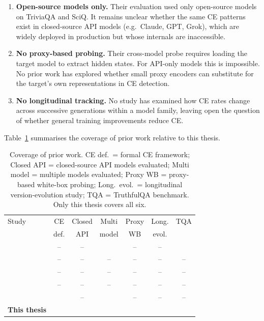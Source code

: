 \documentclass[12pt,twocolumn]{article}
\newcommand{\cmark}{\ding{51}}
\begin{document}
\begin{enumerate}[nosep]
\item \textbf{Open-source models only.} Their evaluation used only
  open-source models on TriviaQA and SciQ. It remains unclear
  whether the same CE patterns exist in closed-source API models
  (e.g.\ Claude, GPT, Grok), which are widely deployed in production
  but whose internals are inaccessible.
\item \textbf{No proxy-based probing.} Their cross-model probe
  requires loading the target model to extract hidden states. For
  API-only models this is impossible. No prior work has explored
  whether small proxy encoders can substitute for the target's own
  representations in CE detection.
\item \textbf{No longitudinal tracking.} No study has examined how
  CE rates change across successive generations within a model
  family, leaving open the question of whether general training
  improvements reduce CE.
\end{enumerate}

Table~\ref{tab:gap} summarises the coverage of prior work relative
to this thesis.

\begin{table}[H]
\centering
\tiny
\setlength{\tabcolsep}{3pt}
\begin{tabular}{@{}lcccccc@{}}
\toprule
Study & CE & Closed & Multi & Proxy & Long. & TQA \\
      & def. & API & model & WB   & evol. &     \\
\midrule
\citet{lin2022truthfulqa}       & -- & -- & \cmark & -- & -- & \cmark \\
\citet{azaria2023internal}      & -- & -- & --         & -- & -- & -- \\
\citet{manakul2023selfcheckgpt} & -- & -- & --         & -- & -- & -- \\
\citet{han2025factuality}       & -- & -- & --         & -- & -- & -- \\
\citet{tan2025consistent}       & \cmark & -- & \cmark & -- & -- & -- \\
\textbf{This thesis}            & \cmark & \cmark & \cmark & \cmark & \cmark & \cmark \\
\bottomrule
\end{tabular}
\caption{Coverage of prior work. CE def.\ = formal CE framework;
Closed API = closed-source API models evaluated;
Multi model = multiple models evaluated; Proxy WB = proxy-based
white-box probing; Long.\ evol.\ = longitudinal version-evolution
study; TQA = TruthfulQA benchmark. Only this thesis covers all six.}
\label{tab:gap}
\end{table}
\end{document}
